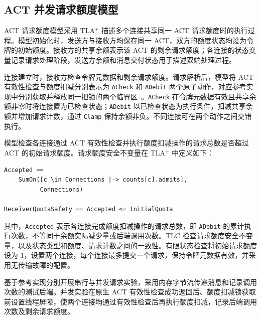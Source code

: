 \subsection{ACT 并发请求额度模型}
\label{subsec:act-quota-model}

ACT 请求额度模型采用 TLA$^{+}$ 描述多个连接共享同一 ACT 请求额度时的执行过程。模型初始化时，发送方与接收方均保存同一 ACT，双方的额度状态均设为令牌的初始额度。接收方的共享余额表示该 ACT 的剩余请求额度；各连接的状态变量记录请求处理阶段，发送方余额和消息交付状态用于描述双端处理过程。

连接建立时，接收方检查令牌元数据和剩余请求额度。请求解析后，模型将 ACT 有效性检查与额度扣减分别表示为 \texttt{ACheck} 和 \texttt{ADebit} 两个原子动作，对应参考实现中分别获取并释放同一把锁的两个临界区~\cite{sagaReferenceImpl2026}。\texttt{ACheck} 在令牌元数据有效且共享余额非零时将连接置为已检查状态；\texttt{ADebit} 以已检查状态为执行条件，扣减共享余额并增加请求计数，通过 \texttt{Clamp} 保持余额非负。不同连接可在两个动作之间交错执行。

模型检查各连接通过 ACT 有效性检查并执行额度扣减操作的请求总数是否超过 ACT 的初始请求额度。请求额度安全不变量在 TLA$^{+}$ 中定义如下：

\begingroup
\renewcommand{\verbatimsize}{\footnotesize}
\setlength{\verbatimbaselineskip}{10pt}
\noindent\begin{minipage}{\linewidth}
\begin{verbatim}
Accepted ==
    SumOn([c \in Connections |-> counts[c].admits],
          Connections)

ReceiverQuotaSafety == Accepted <= InitialQuota
\end{verbatim}
\end{minipage}
\endgroup

其中，\texttt{Accepted} 表示各连接完成额度扣减操作的请求总数，即 \texttt{ADebit} 的累计执行次数，不等同于余额实际减少量或后端调用次数。TLC 检查请求额度安全不变量，以及状态类型和额度、请求计数之间的一致性。有限状态检查将初始请求额度设为 $1$，设置两个连接，每个连接最多提交一个请求，保持令牌元数据有效，并采用无传输故障的配置。

基于参考实现分别开展串行与并发请求实验，采用内存字节流传递消息和记录调用次数的测试后端。并发实验在原生 ACT 有效性检查成功返回后、额度扣减锁获取前设置线程屏障，使两个连接均通过有效性检查后再执行额度扣减，记录后端调用次数及剩余请求额度。
